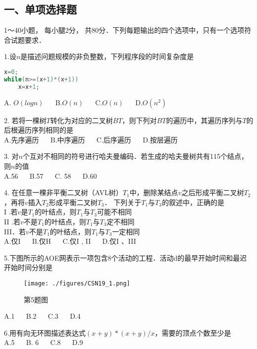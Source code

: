 
\subsection{一、单项选择题}
1～40小题， 每小腿2分， 共80分．下列每题输出的四个选项中，只有一个选项符合试题要求．

1.设$n$是描述问题规模的非负整数，下列程序段的时间复杂度是
\begin{lstlisting}[language=cpp]
x=0;
while(n>=(x+1)*(x+1))
    x=x+1;
\end{lstlisting}
A. $O(logn)$  $\quad$  B.$O(n)$  $\quad$   C.$O(n)$  $\quad$  D.$O(n^2)$

2. 若将一棵树$T$转化为对应的二叉树$BT$，则下列对$BT$的遍历中，其遍历序列与$T$的后根遍历序列相同的是 \\
A.先序遍历  $\quad$  B.中序遍历  $\quad$  C.后序遍历  $\quad$ D.按层遍历

3. 对$n$个互对不相同的符号进行哈夫曼编码．若生成的哈夫曼树共有115个结点，则$n$的值 \\
A.56  $\quad$  B.57  $\quad$  C. 58  $\quad$  D.60

4. 在任意一棵非平衡二叉树（AVL树）$T_1$中，删除某结点$v$之后形成平衡二叉树$T_2$，再将$v$插入$T_2$形成平衡二叉树$T_3$． 下列关于$T_1$与$T_3$的叙述中，正确的是 \\
I .若$v$是$T_1$的叶结点，则$T_1$与$T_3$可能不相同 \\
II .若$v$不是$T_1$的叶结点，则$T_1$与$T_3$定不相同  \\
III．若$v$不是$T_1$的叶结点，则$T_1$与$T_3$一定相同 \\
A.仅I  $\quad$  B.仅H  $\quad$ C.仅I , II  $\quad$  D.仅I 、III

5.下图所示的AOE网表示一项包含8个活动的工程．活动d的最早开始时间和最迟开始时间分别是
\begin{figure}[ht]
\centering
\texttt{[image: ./figures/CSN19\_1.png]}
\caption{第5题图} \label{CSN19_fig1}
\end{figure}
A.1  $\quad$  B.2  $\quad$  C.3  $\quad$  D.4

6.用有向无环图描述表达式$(x+y)*(x+y)/x$，需要的顶点个数至少是 \\
A.5  $\quad$  B. 6  $\quad$  C.8  $\quad$  D.9



